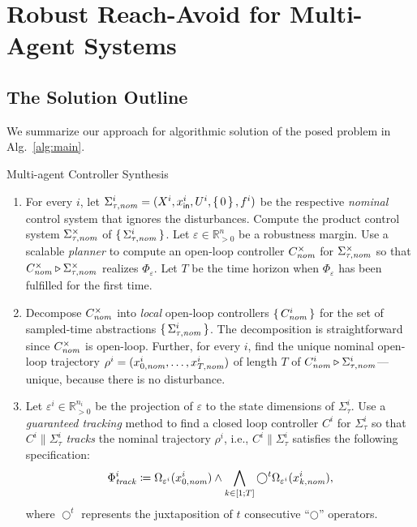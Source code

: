 \section{Robust Reach-Avoid for Multi-Agent Systems}
\subsection{The Solution Outline}
We summarize our approach for algorithmic solution of the posed problem in Alg.~\ref{alg:main}.

\begin{algorithm}
	\caption{Multi-agent Controller Synthesis}
	\label{alg:main}
	\begin{enumerate}
		\item For every $i$, let $\Sigma_{\tau,\mathit{nom}}^i = (X^i,x_{\mathsf{in}}^i,U^i,\set{0},f^i)$ be the respective \emph{nominal} control system that ignores the disturbances.
		Compute the product control system $\Sigma^\times_{\tau,\mathit{nom}}$ of $\set{\Sigma^i_{\tau,\mathit{nom}}}$. 
		Let $\varepsilon\in \mathbb{R}^n_{>0}$ be a robustness margin. %
		Use a scalable \emph{planner} to compute an open-loop controller $C^\times_{\mathit{nom}}$ for $\Sigma^\times_{\tau,\mathit{nom}}$ so that $C^\times_{\mathit{nom}}\triangleright\Sigma_{\tau,\mathit{nom}}^{\times}$ realizes  $\Phi_\varepsilon$.
		Let $T$ be the time horizon when $\Phi_\varepsilon$ has been fulfilled for the first time. \label{step:planning}
		\item Decompose $C^\times_{\mathit{nom}}$ into \emph{local} open-loop controllers $\set{C^i_{\mathit{nom}}}$ for the set of sampled-time abstractions $\set{\Sigma^i_{\tau,\mathit{nom}}}$.
		The decomposition is straightforward since $C^\times_{\mathit{nom}}$ is open-loop. Further, for every $i$, find the unique nominal open-loop trajectory $\rho^i=(x_{0,\mathit{nom}}^i,\ldots,x_{T,\mathit{nom}}^i)$ of length $T$ of $C^i_{\mathit{nom}}\triangleright \Sigma_{\tau,\mathit{nom}}^i$---unique, because there is no disturbance. \label{step:decompose}
		\item Let $\varepsilon^i\in \mathbb{R}^{n_i}_{>0}$ be the projection of $\varepsilon$ to the state dimensions of $\Sigma_{\tau}^i$.
		Use a \emph{guaranteed tracking} method to find a closed loop controller $C^i$ for $\Sigma_{\tau}^i$ so that $C^i\parallel \Sigma_\tau^i$ \emph{tracks} the nominal trajectory $\rho^i$, i.e., $C^i\parallel \Sigma_\tau^i$ satisfies the following specification:
		\begin{align}
			\label{eq:ltl_spec}
			\Phi_{\mathit{track}}^i\coloneqq \Omega_{\varepsilon^i}(x_{0,\mathit{nom}}^i) \wedge \bigwedge_{k\in [1;T]} \bigcirc^t \Omega_{\varepsilon^i}(x_{k,\mathit{nom}}^i),
		\end{align}
		where %
		$\bigcirc^t$ represents the juxtaposition of $t$ consecutive ``$\bigcirc$'' operators.\label{step:tracking}
	\end{enumerate}
\end{algorithm}

